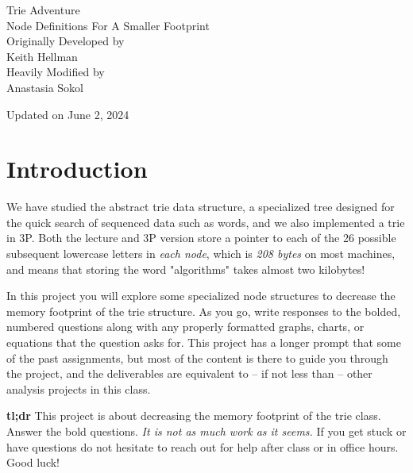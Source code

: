 \documentclass{article}
\begin{document}
\begin{titlepage}
    \centering
    \vspace{2cm}
    
    {\Huge Trie Adventure}\\[2cm]
    
    {\huge Node Definitions For A Smaller Footprint}\\[2cm]
    
    {\large Originally Developed by}\\[0.3cm]
    {\large Keith Hellman}\\[2cm]
    
    {\large Heavily Modified by}\\[0.3cm]
    {\large Anastasia Sokol}\\
    
    \vfill
    
    {\large Updated on June 2, 2024}
\end{titlepage}

\section{Introduction}

We have studied the abstract trie data structure, a specialized tree designed for the quick search of sequenced data such as words, and we also implemented a trie in 3P. Both the lecture and 3P version store a pointer to each of the 26 possible subsequent lowercase letters in \textit{each node}, which is \textit{208 bytes} on most machines, and means that storing the word "algorithms" takes almost two kilobytes!

In this project you will explore some specialized node structures to decrease the memory footprint of the trie structure. As you go, write responses to the bolded, numbered questions along with any properly formatted graphs, charts, or equations that the question asks for. This project has a longer prompt that some of the past assignments, but most of the content is there to guide you through the project, and the deliverables are equivalent to -- if not less than -- other analysis projects in this class.

\begin{tcolorbox}[colback=tldrbox, colframe=black, width=\textwidth, boxrule=0.5mm, arc=5mm, auto outer arc]
        \textbf{tl;dr} This project is about decreasing the memory footprint of the trie class. Answer the bold questions. \textit{It is not as much work as it seems.} If you get stuck or have questions do not hesitate to reach out for help after class or in office hours. Good luck!
\end{tcolorbox}
\end{document}
